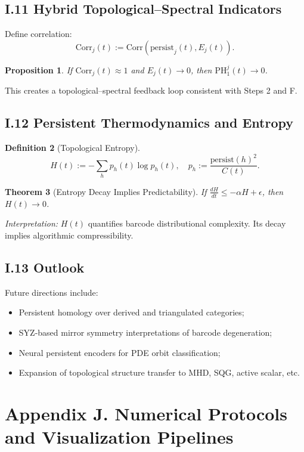 \documentclass[11pt]{article}
\newtheorem{theorem}{Theorem}[section]
\newtheorem{proposition}[theorem]{Proposition}
\theoremstyle{definition}
\newtheorem{definition}[theorem]{Definition}
\begin{document}
\subsection*{I.11 Hybrid Topological--Spectral Indicators}
Define correlation:
\[
\mathrm{Corr}_j(t) := \mathrm{Corr}(\mathrm{persist}_j(t), E_j(t)).
\]
\begin{proposition}
If $\mathrm{Corr}_j(t) \approx 1$ and $E_j(t) \to 0$, then $\mathrm{PH}_1^j(t) \to 0$.
\end{proposition}
This creates a topological–spectral feedback loop consistent with Steps 2 and F.

\subsection*{I.12 Persistent Thermodynamics and Entropy}
\begin{definition}[Topological Entropy]
\[
H(t) := - \sum_h p_h(t) \log p_h(t), \quad p_h := \frac{\mathrm{persist}(h)^2}{C(t)}.
\]
\end{definition}
\begin{theorem}[Entropy Decay Implies Predictability]
If $\frac{dH}{dt} \leq -\alpha H + \epsilon$, then $H(t) \to 0$.
\end{theorem}
\textit{Interpretation:} $H(t)$ quantifies barcode distributional complexity. Its decay implies algorithmic compressibility.

\subsection*{I.13 Outlook}
Future directions include:
\begin{itemize}
  \item Persistent homology over derived and triangulated categories;
  \item SYZ-based mirror symmetry interpretations of barcode degeneration;
  \item Neural persistent encoders for PDE orbit classification;
  \item Expansion of topological structure transfer to MHD, SQG, active scalar, etc.
\end{itemize}


\section*{Appendix J. Numerical Protocols and Visualization Pipelines}
\end{document}
